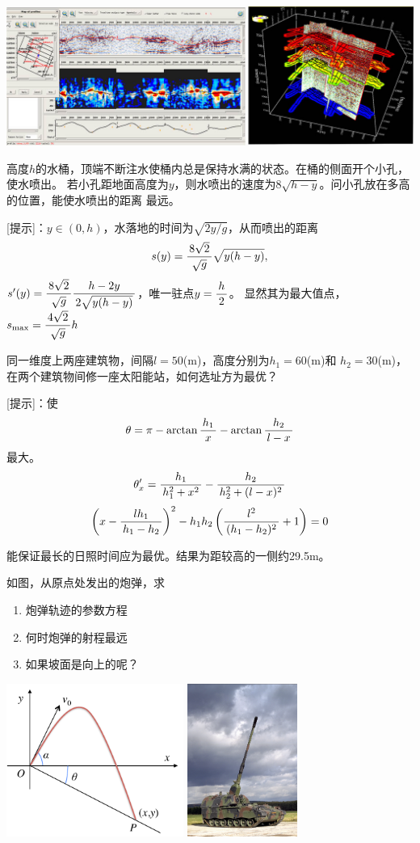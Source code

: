 \begin{shaded}
\begin{center}
		\includegraphics[width=.8\textwidth]{./images/ch03/RS-dataP-2.jpg}
	\end{center}
\end{shaded}

\egz 高度$h$的水桶，顶端不断注水使桶内总是保持水满的状态。在桶的侧面开个小孔，使水喷出。
若小孔距地面高度为$y$，则水喷出的速度为$8\sqrt{h-y}$。问小孔放在多高的位置，能使水喷出的距离
最远。

[提示]：$y\in(0,h)$，水落地的时间为$\sqrt{2y/g}$，从而喷出的距离
$$s(y)=\displaystyle\frac{\,{8\sqrt{2}}\,}{\,{\sqrt g}\,}\sqrt{y(h-y)},$$
$s'(y)=\displaystyle\frac{\,{8\sqrt{2}}\,}{\,{\sqrt g}\,}\displaystyle\frac{\,{h-2y}\,}{\,{2\sqrt{y(h-y)}}\,}$，唯一驻点$y=\displaystyle\frac{\,{h}\,}{\,{2}\,}$。
显然其为最大值点，$s_{\max}=\displaystyle\frac{\,{4\sqrt 2}\,}{\,{\sqrt{g}}\,}h$

\egz 同一维度上两座建筑物，间隔$l=50$(m)，高度分别为$h_1=60$(m)和
$h_2=30$(m)，在两个建筑物间修一座太阳能站，如何选址方为最优？

[提示]：使
$$\theta=\pi-\arctan\displaystyle\frac{\,{h_1}\,}{\,{x}\,}-\arctan\displaystyle\frac{\,{h_2}\,}{\,{l-x}\,}$$
最大。
$$\theta'_x=\displaystyle\frac{\,{h_1}\,}{\,{h_1^2+x^2}\,}-\displaystyle\frac{\,{h_2}\,}{\,{h_2^2+(l-x)^2}\,}$$
$$\left(x-\displaystyle\frac{\,{lh_1}\,}{\,{h_1-h_2}\,}\right)^2-h_1h_2\left(\displaystyle\frac{\,{l^2}\,}{\,{(h_1-h_2)^2}\,}+1\right)=0$$

能保证最长的日照时间应为最优。结果为距较高的一侧约29.5m。

\egz 如图，从原点处发出的炮弹，求
\begin{enumerate}[(1)]
  \setlength{\itemindent}{1cm}
  \item 炮弹轨迹的参数方程
  \item 何时炮弹的射程最远
  \item 如果坡面是向上的呢？
\end{enumerate}
\begin{center}
	\includegraphics[height=5cm]{./images/ch03/bFly.pdf}\quad
	\includegraphics[height=5cm]{./images/ch03/hCannon.jpg}
\end{center}

